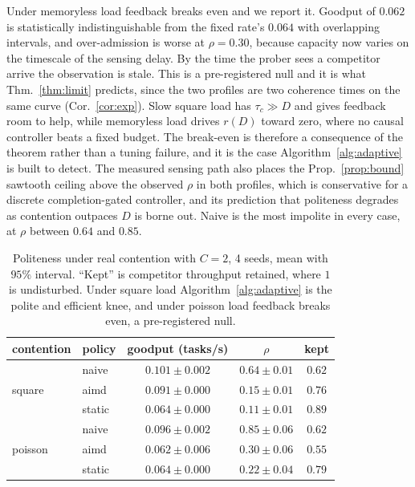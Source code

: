 Under memoryless load feedback breaks even and we report it. Goodput of $0.062$ is
statistically indistinguishable from the fixed rate's $0.064$ with overlapping
intervals, and over-admission is worse at $\rho=0.30$, because capacity now varies
on the timescale of the sensing delay. By the time the prober sees a competitor
arrive the observation is stale. This is a pre-registered null and it is what
Thm.~\ref{thm:limit} predicts, since the two profiles are two coherence times on
the same curve (Cor.~\ref{cor:exp}). Slow square load has $\tau_c\gg D$ and gives
feedback room to help, while memoryless load drives $r(D)$ toward zero, where no
causal controller beats a fixed budget. The break-even is therefore a consequence
of the theorem rather than a tuning failure, and it is the case
Algorithm~\ref{alg:adaptive} is built to detect. The measured sensing path also
places the Prop.~\ref{prop:bound} sawtooth ceiling above the observed $\rho$ in
both profiles, which is conservative for a discrete completion-gated controller,
and its prediction that politeness degrades as contention outpaces $D$ is borne
out. Naive is the most impolite in every case, at $\rho$ between $0.64$ and
$0.85$.

\begin{table}[t]
\centering
\caption{Politeness under real contention with $C{=}2$, 4 seeds, mean with $95\%$
interval. ``Kept'' is competitor throughput retained, where $1$ is undisturbed.
Under square load Algorithm~\ref{alg:adaptive} is the polite and efficient knee,
and under poisson load feedback breaks even, a pre-registered null.}
\label{tab:e9}
\small
\begin{tabular}{llccc}
\toprule
contention & policy & goodput (tasks/s) & $\rho$ & kept \\
\midrule
\multirow{3}{*}{square}
 & naive  & $0.101\pm0.002$ & $0.64\pm0.01$ & $0.62$ \\
 & aimd   & $0.091\pm0.000$ & $0.15\pm0.01$ & $0.76$ \\
 & static & $0.064\pm0.000$ & $0.11\pm0.01$ & $0.89$ \\
\midrule
\multirow{3}{*}{poisson}
 & naive  & $0.096\pm0.002$ & $0.85\pm0.06$ & $0.62$ \\
 & aimd   & $0.062\pm0.006$ & $0.30\pm0.06$ & $0.55$ \\
 & static & $0.064\pm0.000$ & $0.22\pm0.04$ & $0.79$ \\
\bottomrule
\end{tabular}
\end{table}


